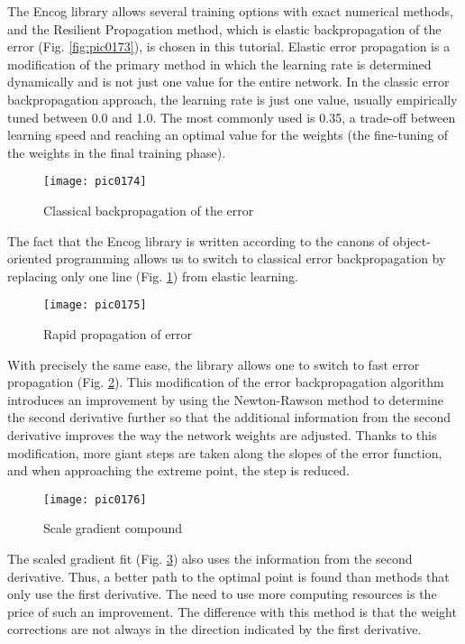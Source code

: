 The Encog library allows several training options with exact numerical methods, and the Resilient Propagation method, which is elastic backpropagation of the error (Fig. \ref{fig:pic0173}), is chosen in this tutorial. Elastic error propagation is a modification of the primary method in which the learning rate is determined dynamically and is not just one value for the entire network. In the classic error backpropagation approach, the learning rate is just one value, usually empirically tuned between 0.0 and 1.0. The most commonly used is 0.35, a trade-off between learning speed and reaching an optimal value for the weights (the fine-tuning of the weights in the final training phase).

\begin{figure}[h]
\centering
\texttt{[image: pic0174]}
\caption{Classical backpropagation of the error}
\label{fig:pic0174}
\end{figure}
\FloatBarrier

The fact that the Encog library is written according to the canons of object-oriented programming allows us to switch to classical error backpropagation by replacing only one line (Fig. \ref{fig:pic0174}) from elastic learning.

\begin{figure}[h]
\centering
\texttt{[image: pic0175]}
\caption{Rapid propagation of error}
\label{fig:pic0175}
\end{figure}
\FloatBarrier

With precisely the same ease, the library allows one to switch to fast error propagation (Fig. \ref{fig:pic0175}). This modification of the error backpropagation algorithm introduces an improvement by using the Newton-Rawson method to determine the second derivative further so that the additional information from the second derivative improves the way the network weights are adjusted. Thanks to this modification, more giant steps are taken along the slopes of the error function, and when approaching the extreme point, the step is reduced.

\begin{figure}[h]
\centering
\texttt{[image: pic0176]}
\caption{Scale gradient compound}
\label{fig:pic0176}
\end{figure}
\FloatBarrier

The scaled gradient fit (Fig. \ref{fig:pic0176}) also uses the information from the second derivative. Thus, a better path to the optimal point is found than methods that only use the first derivative. The need to use more computing resources is the price of such an improvement. The difference with this method is that the weight corrections are not always in the direction indicated by the first derivative.

